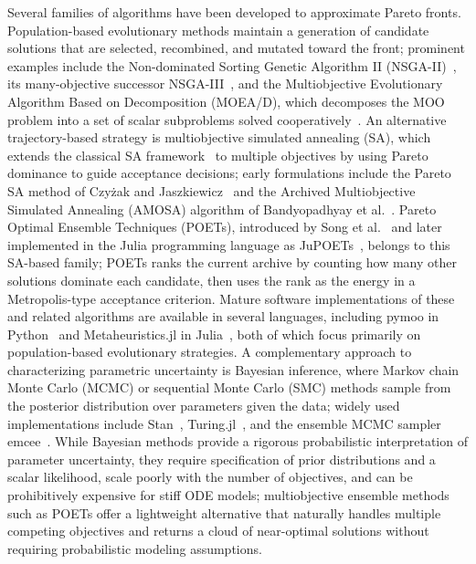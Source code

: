 \documentclass[preprint,review,12pt]{elsarticle}
\begin{document}
Several families of algorithms have been developed to approximate Pareto fronts.
Population-based evolutionary methods maintain a generation of candidate solutions that are selected, recombined, and mutated toward the front; prominent examples include the Non-dominated Sorting Genetic Algorithm II (NSGA-II)~\cite{Deb2002}, its many-objective successor NSGA-III~\cite{Deb2014}, and the Multiobjective Evolutionary Algorithm Based on Decomposition (MOEA/D), which decomposes the MOO problem into a set of scalar subproblems solved cooperatively~\cite{Zhang2007}.
An alternative trajectory-based strategy is multiobjective simulated annealing (SA), which extends the classical SA framework~\cite{Kirkpatrick1983} to multiple objectives by using Pareto dominance to guide acceptance decisions; early formulations include the Pareto SA method of Czy\.{z}ak and Jaszkiewicz~\cite{Czyzak1998} and the Archived Multiobjective Simulated Annealing (AMOSA) algorithm of Bandyopadhyay et al.~\cite{Bandyopadhyay2008}.
Pareto Optimal Ensemble Techniques (POETs), introduced by Song et al.~\cite{Song2010} and later implemented in the Julia programming language as JuPOETs~\cite{Bassen2016}, belongs to this SA-based family; POETs ranks the current archive by counting how many other solutions dominate each candidate, then uses the rank as the energy in a Metropolis-type acceptance criterion.
Mature software implementations of these and related algorithms are available in several languages, including pymoo in Python~\cite{Blank2020} and Metaheuristics.jl in Julia~\cite{Mejia2022}, both of which focus primarily on population-based evolutionary strategies.
A complementary approach to characterizing parametric uncertainty is Bayesian inference, where Markov chain Monte Carlo (MCMC) or sequential Monte Carlo (SMC) methods sample from the posterior distribution over parameters given the data; widely used implementations include Stan~\cite{Carpenter2017}, Turing.jl~\cite{Ge2018}, and the ensemble MCMC sampler emcee~\cite{ForemanMackey2013}.
While Bayesian methods provide a rigorous probabilistic interpretation of parameter uncertainty, they require specification of prior distributions and a scalar likelihood, scale poorly with the number of objectives, and can be prohibitively expensive for stiff ODE models; multiobjective ensemble methods such as POETs offer a lightweight alternative that naturally handles multiple competing objectives and returns a cloud of near-optimal solutions without requiring probabilistic modeling assumptions.
\end{document}
